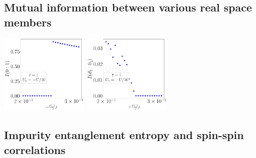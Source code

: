 \documentclass{report}
\numberwithin{equation}{section}
\begin{document}
\subsection*{Mutual information between various real space members}
\begin{center}
	\includegraphics[width=0.32\textwidth]{../figures/mi-01-D=1000.00000,t=1.00000,J=30.00000,V=1.50000J,Ub=-Uby10,N=4,U=59.85787,93.55363,25.pdf}
	\includegraphics[width=0.32\textwidth]{../figures/mi-d0-D=1000.00000,t=1.00000,J=30.00000,V=1.50000J,Ub=-Uby10,N=4,U=59.85787,93.55363,25.pdf}
\end{center}

\subsection*{Impurity entanglement entropy and spin-spin correlations}
\end{document}
